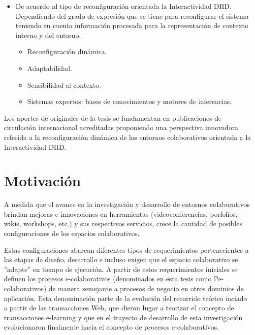 {\begin{itemize}
\item De acuerdo al tipo de reconfiguración orientada la Interactividad DHD\cite{libro.unr}. Dependiendo del grado de expresión que se
tiene para reconfigurar el sistema teniendo en cuenta información procesada
para la representación de contexto interno y del entorno.

\begin{itemize}
 \item Reconfiguración dinámica.
 \item Adaptabilidad.
 \item Sensibilidad al contexto.
 \item Sistemas expertos: bases de conocimientos y motores de inferencias.
\end{itemize}

\end{itemize}


Los aportes de originales de la tesis se fundamentan en publicaciones de circulación internacional acreditadas proponiendo una perspectiva innovadora referida a la reconfiguración dinámica de los entornos colaborativos orientada a la Interactividad DHD.


\section{Motivación}\label{sec:motivacion}


A medida que el avance en la investigación y desarrollo de entornos
colaborativos brindan mejoras e innovaciones en herramientas
(videoconferencias, porfolios, wikis, workshops, etc.) y sus respectivos
servicios, crece la cantidad de posibles configuraciones de los espacios
colaborativos.

Estas configuraciones abarcan diferentes tipos de requerimientos pertenecientes
a las  etapas de diseño, desarrollo e incluso exigen que el espacio
colaborativo se ''adapte'' en tiempo de ejecución. A partir de estos
requerimientos iniciales se
definen los procesos e-colaborativos (denominados en esta tesis como
Pe-colaborativos) \cite{cacic2007.7} de manera semejante a procesos de negocio
en otros dominios de
aplicación. Esta denominación parte de la evolución del recorrido
teórico inciado a partir de las transacciones Web, que dieron lugar a
teorizar el concepto de transacciones e-learning \cite{cacic2007} y que en el trayecto de desarrollo de esta investigación evolucionaron finalmente hacia el concepto de
procesos e-colaborativos. 

}
